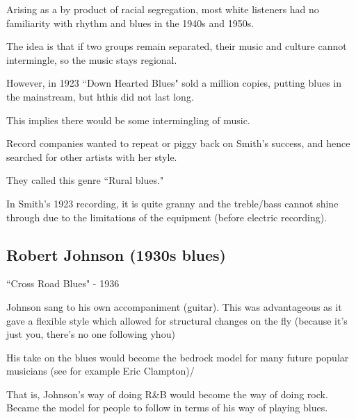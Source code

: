 \documentclass[12pt, a4paper, twoside, openright, titlepage]{book}
\begin{document}
Arising as a by product of racial segregation, most white listeners had no familiarity with rhythm and blues in the 1940s and 1950s.

The idea is that if two groups remain separated, their music and culture cannot intermingle, so the music stays regional.

\begin{rmk}{}{}
    However, in 1923  ``Down Hearted Blues" sold a million copies, putting blues in the mainstream, but hthis did not last long.
\end{rmk}

This implies there would be some intermingling of music.

\begin{rmk}{}{}
    Record companies wanted to repeat or piggy back on Smith's success, and hence searched for other artists with her style.

    They called this genre ``Rural blues."
\end{rmk}

\begin{note}{}{}
    In Smith's 1923 recording, it is quite granny and the treble/bass cannot shine through due to the limitations of the equipment (before electric recording).
\end{note}

\subsection{Robert Johnson (1930s blues)}

\begin{eg}{}{}
    ``Cross Road Blues" - 1936
    \begin{note}{}{}
        Johnson sang to his own accompaniment (guitar). This was advantageous as it gave a flexible style which allowed for structural changes on the fly (because it's just you, there's no one following yhou)
    \end{note}
\end{eg}

\begin{rmk}{}{}
    His take on the blues would become the bedrock model for many future popular musicians (see for example Eric Clampton)/

    That is, Johnson's way of doing R\&B would become the way of doing rock. Became the model for people to follow in terms of his way of playing blues.
\end{rmk}
\end{document}
